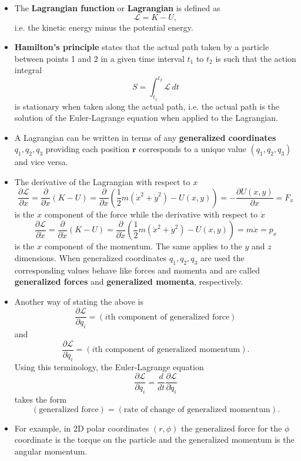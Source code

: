 \documentclass{article}
\renewcommand{\vec}[1]{\boldsymbol{\mathbf{#1}}}
\begin{document}
\begin{itemize}
  \item The \textbf{Lagrangian function} or \textbf{Lagrangian} is defined as \[\mathcal{L} = K - U,\] i.e. the kinetic energy minus the potential energy.

  \item \textbf{Hamilton's principle} states that the actual path taken by a particle between points 1 and 2 in a given time interval $t_1$ to $t_2$ is such that the action integral \[S = \int_{t_1}^{t_2} \mathcal{L} \,dt\] is stationary when taken along the actual path, i.e. the actual path is the solution of the Euler-Lagrange equation when applied to the Lagrangian.

  \item A Lagrangian can be written in terms of any \textbf{generalized coordinates} $q_1, q_2, q_3$ providing each position $\vec{r}$ corresponds to a unique value $(q_1, q_2, q_3)$ and vice versa.

  \item The derivative of the Lagrangian with respect to $x$ \[\frac{\partial \mathcal{L}}{\partial x} = \frac{\partial}{\partial x} (K - U) = \frac{\partial}{\partial x} \left( \frac{1}{2} m (\dot{x}^2 + \dot{y}^2) - U(x, y) \right) = -\frac{\partial U(x, y)}{\partial x} = F_x\] is the $x$ component of the force while the derivative with respect to $\dot{x}$ \[\frac{\partial \mathcal{L}}{\partial \dot{x}} = \frac{\partial}{\partial \dot{x}} (K - U) = \frac{\partial}{\partial \dot{x}} \left( \frac{1}{2} m (\dot{x}^2 + \dot{y}^2) - U(x, y) \right) = m \dot{x} = p_x\] is the $x$ component of the momentum. The same applies to the $y$ and $z$ dimensions. When generalized coordinates $q_1, q_2, q_3$ are used the corresponding values behave like forces and momenta and are called \textbf{generalized forces} and \textbf{generalized momenta}, respectively.

  \item Another way of stating the above is \[\frac{\partial \mathcal{L}}{\partial q_i} = (i\text{th component of generalized force})\] and \[\frac{\partial \mathcal{L}}{\partial \dot{q}_i} = (i\text{th component of generalized momentum}).\] Using this terminology, the Euler-Lagrange equation \[\frac{\partial \mathcal{L}}{\partial q_i} = \frac{d}{d t} \frac{\partial \mathcal{L}}{\partial \dot{q}_i}\] takes the form \[(\text{generalized force}) = (\text{rate of change of generalized momentum}).\]

  \item For example, in 2D polar coordinates $(r, \phi)$ the generalized force for the $\phi$ coordinate is the torque on the particle and the generalized momentum is the angular momentum.


\end{itemize}
\end{document}
